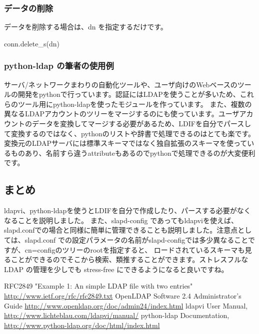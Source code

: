 \documentclass[mingoth,a4paper]{jsarticle}
\begin{document}
\subsubsection{データの削除}

データを削除する場合は、dn を指定するだけです。

\begin{commandline}
conn.delete_s(dn)
\end{commandline}

\subsubsection{python-ldap の筆者の使用例}
サーバ/ネットワークまわりの自動化ツールや、ユーザ向けのWebベースのツールの開発をpythonで行っています。認証にはLDAPを使うことが多いため、これらのツール用にpython-ldapを使ったモジュールを作っています。
また、複数の異なるLDAPアカウントのツリーをマージするのにも使っています。ユーザアカウントのデータを変換してマージする必要があるため、LDIFを自分でパースして変換するのではなく、pythonのリストや辞書で処理できるのはとても楽です。変換元のLDAPサーバには標準スキーマではなく独自拡張のスキーマを使っているものあり、名前すら違うattributeもあるのでpythonで処理できるのが大変便利です。

\subsection{まとめ}
ldapvi、python-ldapを使うとLDIFを自分で作成したり、パースする必要がなくなることを説明しました。 また、slapd-config であってもldapviを使えば、slapd.confでの場合と同様に簡単に管理できることも説明しました。注意点としては、slapd.conf での設定パラメータの名前がslapd-configでは多少異なることですが、cn=configのツリーのrootを指定すると、 ロードされているスキーマも見ることができるのでそこから検索、類推することができます。ストレスフルな LDAP の管理を少しでも stress-free にできるようになると良いですね。

\begin{thebibliography}{0}
   RFC2849 "Example 1: An simple LDAP file with two entries" \url{http://www.ietf.org/rfc/rfc2849.txt}
   OpenLDAP Software 2.4 Administrator's Guide \url{http://www.openldap.org/doc/admin24/index.html}
   ldapvi User Manual, \url{http://www.lichteblau.com/ldapvi/manual/}
   python-ldap Documentation, \url{http://www.python-ldap.org/doc/html/index.html}
\end{thebibliography}
\end{document}
